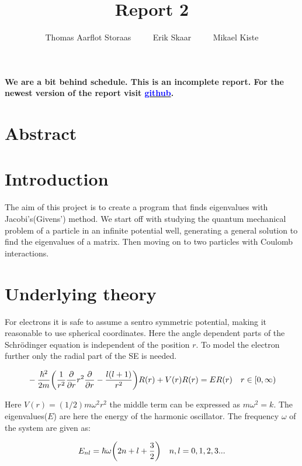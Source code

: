 

\author{Thomas Aarflot Storaas    $\qquad$    Erik Skaar  $\qquad$    Mikael Kiste}
\title{Report 2}
\maketitle


\textbf{We are a bit behind schedule. This is an incomplete report. For the newest version of the report visit \href{https://github.com/erikfsk/Project-2}{\textcolor{blue}{github}}.}

\section{Abstract}


\section{Introduction}
The aim of this project is to create a program that finds eigenvalues with Jacobi's(Givens') method. We start off with studying the quantum mechanical problem of a particle in an infinite potential well, generating a general solution to find the eigenvalues of a matrix. Then moving on to two particles with Coulomb interactions.

\section{Underlying theory}

For electrons it is safe to assume a sentro symmetric potential, making it reasonable to use spherical coordinates. Here the angle dependent parts of the Schrödinger equation is independent of the position $r$. To model the electron further only the radial part of the SE is needed.

\begin{align}
	&-\frac{\hbar^2}{2m}\qty(\frac{1}{r^2}\pdv{r}r^2\pdv{r}-\frac{l(l+1)}{r^2})R(r)+V(r)R(r)=ER(r) &r\in[0,\infty)
\end{align}

Here $V(r)=(1/2)m\omega^2r^2$ the middle term can be expressed as $m\omega^2=k$. The eigenvalues($E$) are here the energy of the harmonic oscillator.  The frequency $\omega$ of the system are given as:

\begin{align}
	E_{nl}&=\hbar\omega\qty(2n+l+\frac{3}{2}) &n,l=0,1,2,3...
\end{align}

